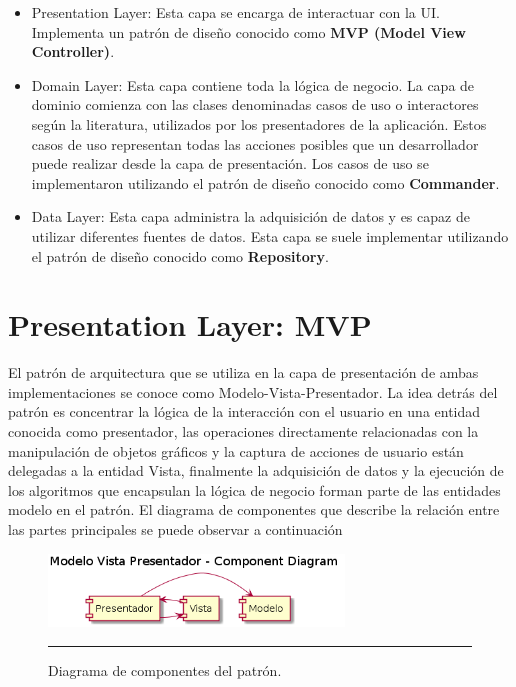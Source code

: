 \begin{itemize}
	\item Presentation Layer: Esta capa se encarga de interactuar con la UI. Implementa un patrón de diseño conocido como \textbf{MVP (Model View Controller)}. 
	\item Domain Layer: Esta capa contiene toda la lógica de negocio. La capa de dominio comienza con las clases denominadas casos de uso o interactores según la literatura, utilizados por los presentadores de la aplicación. Estos casos de uso representan todas las acciones posibles que un desarrollador puede realizar desde la capa de presentación. Los casos de uso se implementaron utilizando el patrón de diseño conocido como \textbf{Commander}.
	\item Data Layer: Esta capa administra la adquisición de datos y es capaz de utilizar diferentes fuentes de datos. Esta capa se suele implementar utilizando el patrón de diseño conocido como \textbf{Repository}.  
\end{itemize}

\section{Presentation Layer: MVP}
El patrón de arquitectura que se utiliza en la capa de presentación de ambas implementaciones se conoce como Modelo-Vista-Presentador.
La idea detrás del patrón es concentrar la lógica de la interacción con el usuario en una entidad conocida como presentador, las operaciones directamente relacionadas con la manipulación de objetos gráficos y la captura de acciones de usuario están delegadas a la entidad Vista, finalmente la adquisición de datos y la ejecución de los algoritmos que encapsulan la lógica de negocio forman parte de las entidades modelo en el patrón.
El diagrama de componentes que describe la relación entre las partes principales se puede observar a continuación

\begin{figure}[htbp]
	\centering
	\includegraphics[width=0.7\textwidth]{Figures/uml_mvp_component.png}
	\rule{35em}{1pt}
	\caption[MVP Components]{Diagrama de componentes del patrón.}
	\label{fig:uml_mvp_component}
\end{figure}

